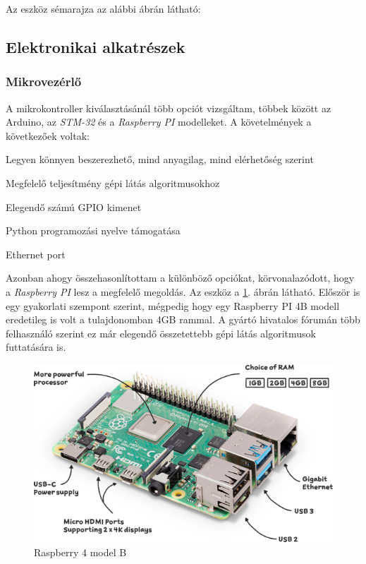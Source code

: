 \documentclass[12pt,a4paper]{article}
\begin{document}
Az eszköz sémarajza az alábbi ábrán látható:


\pagebreak

\subsection{Elektronikai alkatrészek}
\subsubsection*{Mikrovezérlő}
A mikrokontroller kiválasztásánál több opciót vizsgáltam, többek között az {Arduino}, az \textsl{STM-32} és a \textsl{Raspberry PI} modelleket. A követelmények a következőek voltak:

\begin{list}{-}{}
	\item Legyen könnyen beszerezhető, mind anyagilag, mind elérhetőség szerint
	\item Megfelelő teljesítmény gépi látás algoritmusokhoz
	\item Elegendő számú GPIO kimenet
	\item Python programozási nyelve támogatása
	\item Ethernet port
\end{list}

Azonban ahogy összehasonlítottam a különböző opciókat, körvonalazódott, hogy a \textsl{Raspberry PI} lesz a megfelelő megoldás. Az eszköz a \ref{fig:elek_raspberry4b}. ábrán látható. Először is egy gyakorlati szempont szerint, mégpedig hogy egy Raspberry PI 4B modell eredetileg is volt a tulajdonomban 4GB rammal. A gyártó hivatalos fórumán több felhasználó szerint ez már elegendő összetettebb gépi látás algoritmusok futtatására is. \cite{4gbforum} \\

\begin{figure}[h!]
	\centering
	\includegraphics[width=0.7\linewidth]{elek_raspberry4b}
	\caption{Raspberry 4 model B \cite{raspberry4}}
	\label{fig:elek_raspberry4b}
\end{figure}
\end{document}
